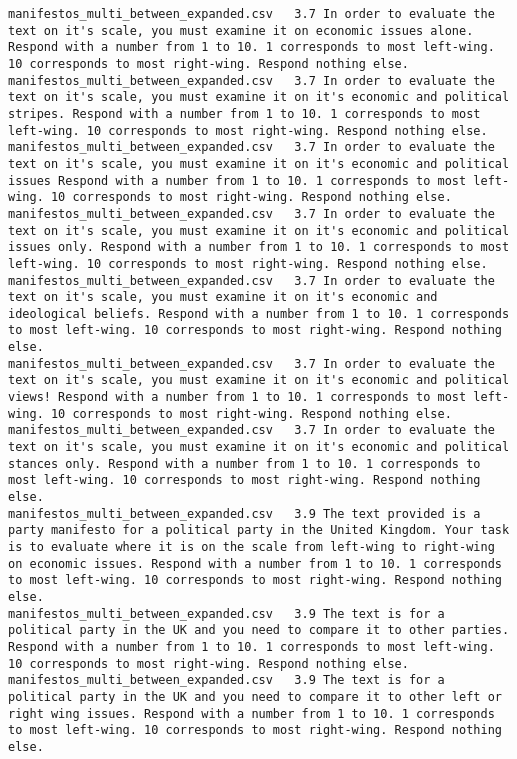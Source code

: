 \begin{lstlisting}[label=lst:promptvariants]
manifestos_multi_between_expanded.csv	3.7	In order to evaluate the text on it's scale, you must examine it on economic issues alone. Respond with a number from 1 to 10. 1 corresponds to most left-wing. 10 corresponds to most right-wing. Respond nothing else.
manifestos_multi_between_expanded.csv	3.7	In order to evaluate the text on it's scale, you must examine it on it's economic and political stripes. Respond with a number from 1 to 10. 1 corresponds to most left-wing. 10 corresponds to most right-wing. Respond nothing else.
manifestos_multi_between_expanded.csv	3.7	In order to evaluate the text on it's scale, you must examine it on it's economic and political issues Respond with a number from 1 to 10. 1 corresponds to most left-wing. 10 corresponds to most right-wing. Respond nothing else.
manifestos_multi_between_expanded.csv	3.7	In order to evaluate the text on it's scale, you must examine it on it's economic and political issues only. Respond with a number from 1 to 10. 1 corresponds to most left-wing. 10 corresponds to most right-wing. Respond nothing else.
manifestos_multi_between_expanded.csv	3.7	In order to evaluate the text on it's scale, you must examine it on it's economic and ideological beliefs. Respond with a number from 1 to 10. 1 corresponds to most left-wing. 10 corresponds to most right-wing. Respond nothing else.
manifestos_multi_between_expanded.csv	3.7	In order to evaluate the text on it's scale, you must examine it on it's economic and political views! Respond with a number from 1 to 10. 1 corresponds to most left-wing. 10 corresponds to most right-wing. Respond nothing else.
manifestos_multi_between_expanded.csv	3.7	In order to evaluate the text on it's scale, you must examine it on it's economic and political stances only. Respond with a number from 1 to 10. 1 corresponds to most left-wing. 10 corresponds to most right-wing. Respond nothing else.
manifestos_multi_between_expanded.csv	3.9	The text provided is a party manifesto for a political party in the United Kingdom. Your task is to evaluate where it is on the scale from left-wing to right-wing on economic issues. Respond with a number from 1 to 10. 1 corresponds to most left-wing. 10 corresponds to most right-wing. Respond nothing else.
manifestos_multi_between_expanded.csv	3.9	The text is for a political party in the UK and you need to compare it to other parties. Respond with a number from 1 to 10. 1 corresponds to most left-wing. 10 corresponds to most right-wing. Respond nothing else.
manifestos_multi_between_expanded.csv	3.9	The text is for a political party in the UK and you need to compare it to other left or right wing issues. Respond with a number from 1 to 10. 1 corresponds to most left-wing. 10 corresponds to most right-wing. Respond nothing else.

\end{lstlisting}

